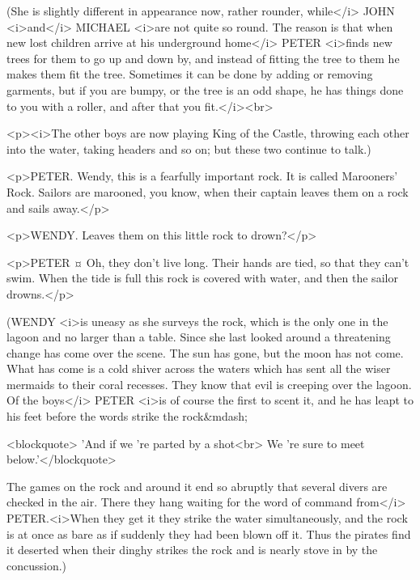 \begin{stagedir}
(She is slightly different in appearance now, rather rounder, while</i> JOHN <i>and</i> MICHAEL <i>are not quite so round. The reason is that when new lost children arrive at his underground home</i> PETER <i>finds new trees for them to go up and down by, and instead of fitting the tree to them he makes them fit the tree. Sometimes it can be done by adding or removing garments, but if you are bumpy, or the tree is an odd shape, he has things done to you with a roller, and after that you fit.</i><br> 

<p><i>The other boys are now playing King of the Castle, throwing each other into the water, taking headers and so on; but these two continue to talk.)
\end{stagedir}

<p>PETER. Wendy, this is a fearfully important rock. It is called Marooners' Rock. Sailors are marooned, you know, when their captain leaves them on a rock and sails away.</p>

<p>WENDY. Leaves them on this little rock to drown?</p>

<p>PETER ¤
Oh, they don't live long. Their hands are tied, so that they can't swim. When the tide is full this rock is covered with water, and then the sailor drowns.</p>

\begin{stagedir}
(WENDY <i>is uneasy as she surveys the rock, which is the only one in the lagoon and no larger than a table. Since she last looked around a threatening change has come over the scene. The sun has gone, but the moon has not come. What has come is a cold shiver across the waters which has sent all the wiser mermaids to their coral recesses. They know that evil is creeping over the lagoon. Of the boys</i> PETER <i>is of course the first to scent it, and he has leapt to his feet before the words strike the rock&mdash;
\end{stagedir}

<blockquote> 'And if we 're parted by a shot<br> We 're sure to meet below.'</blockquote>

\begin{stagedir}
The games on the rock and around it end so abruptly that several divers are checked in the air. There they hang waiting for the word of command from</i> PETER.<i>When they get it they strike the water simultaneously, and the rock is at once as bare as if suddenly they had been blown off it. Thus the pirates find it deserted when their dinghy strikes the rock and is nearly stove in by the concussion.)
\end{stagedir}

